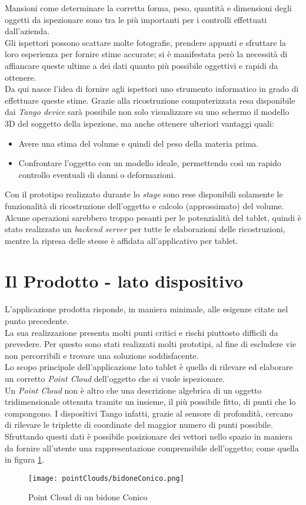 Mansioni come determinare la corretta forma, peso, quantità e dimensioni degli oggetti da ispezionare sono tra le più importanti per i controlli effettuati dall'azienda.\\
Gli ispettori possono scattare molte fotografie, prendere appunti e sfruttare la loro esperienza per fornire stime accurate; si è manifestata però la necessità di affiancare queste ultime a dei dati quanto più possibile oggettivi e rapidi da ottenere.\\
Da qui nasce l'idea di fornire agli ispettori uno strumento informatico in grado di effettuare queste stime. Grazie alla ricostruzione computerizzata resa disponibile dai \emph{Tango device} sarà possibile non solo visualizzare su uno schermo il modello 3D del soggetto della ispezione, ma anche ottenere ulteriori vantaggi quali:
\begin{itemize}
	\item Avere una stima del volume e quindi del peso della materia prima.
	\item Confrontare l'oggetto con un modello ideale, permettendo così un rapido controllo eventuali di danni o deformazioni.
\end{itemize}
Con il prototipo realizzato durante lo \emph{stage} sono rese disponibili solamente le funzionalità di ricostruzione dell'oggetto e calcolo (approssimato) del volume.\\
Alcune operazioni sarebbero troppo pesanti per le potenzialità del tablet, quindi è stato realizzato un \emph{backend server} per tutte le elaborazioni delle ricostruzioni, mentre la ripresa delle stesse è affidata all'applicativo per tablet.

\section{Il Prodotto - lato dispositivo}
L'applicazione prodotta risponde, in maniera minimale, alle esigenze citate nel punto precedente.\\
La sua realizzazione presenta molti punti critici e rischi piuttosto difficili da prevedere. Per questo sono stati realizzati molti prototipi, al fine di escludere vie non percorribili e trovare una soluzione soddisfacente.\\
Lo scopo principale dell'applicazione lato tablet è quello di rilevare ed elaborare un corretto \emph{Point Cloud} dell'oggetto che si vuole ispezionare.\\
Un \emph{Point Cloud} non è altro che una descrizione algebrica di un oggetto tridimensionale ottenuta tramite un insieme, il più possibile fitto, di punti che lo compongono. I dispositivi Tango infatti, grazie al sensore di profondità, cercano di rilevare le triplette di coordinate del maggior numero di punti possibile. Sfruttando questi dati è possibile posizionare dei vettori nello spazio in maniera da fornire all'utente una rappresentazione comprensibile dell'oggetto; come quella in figura \ref{figure:bidone_conico}.
\begin{figure}[H] 
    \centering 
    \texttt{[image: pointClouds/bidoneConico.png]}
    \caption{Point Cloud di un bidone Conico}
    \label{figure:bidone_conico} 
\end{figure}


